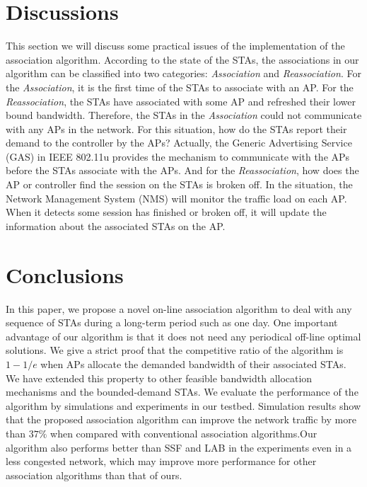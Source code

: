 \documentclass[conference]{IEEEtran}
\begin{document}
  \section{Discussions}\label{sec:discussions}
  This section we will discuss some practical issues of the implementation of the association algorithm.  According to the state of the STAs, the associations in our algorithm can be classified into two categories: \textit{Association} and \textit{Reassociation}.  For the \textit{Association}, it is the first time of the STAs to associate with an AP.  For the \textit{Reassociation}, the STAs have associated with some AP and refreshed their lower bound bandwidth.  Therefore, the STAs in the \textit{Association} could not communicate with any APs in the network.  For this situation, how do the STAs report their demand to the controller by the APs?  Actually, the Generic Advertising Service (GAS) in IEEE 802.11u provides the mechanism to communicate with the APs before the STAs associate with the APs.  And for the \textit{Reassociation}, how does the AP or controller find the session on the STAs is broken off.  In the situation, the Network Management System (NMS) will monitor the traffic load on each AP.  When it detects some session has finished or broken off, it will update the information about the associated STAs on the AP.

  \section{Conclusions}\label{sec:conclusion}
  In this paper, we propose a novel on-line association algorithm to deal with any sequence of STAs during a long-term period such as one day.  One important advantage of our algorithm is that it does not need any periodical off-line optimal solutions.  We give a strict proof that the competitive ratio of the algorithm is $1-1/e$ when APs allocate the demanded bandwidth of their associated STAs.  We have extended this property to other feasible bandwidth allocation mechanisms and the bounded-demand STAs.  We evaluate the performance of the algorithm by simulations and experiments in our testbed.  Simulation results show that the proposed association algorithm can improve the network traffic by more than $37\%$ when compared with conventional association algorithms.Our algorithm also performs better than SSF and LAB in the experiments even in a less congested network, which may improve more performance for other association algorithms than that of ours.
\end{document}
